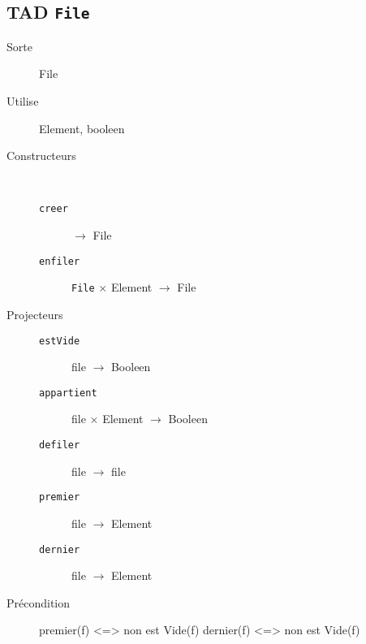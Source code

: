 \subsection{TAD \texttt{File}}
\begin{description}
	\item[Sorte] File
	\item[Utilise] Element, booleen
	\item[Constructeurs]~
		\begin{description}
			\item[\texttt{creer}] $\rightarrow$ File%
			\item[\texttt{enfiler}] \texttt{File} $\times$ Element $\rightarrow$ File
		\end{description}
	\item[Projecteurs] 
		\begin{description}
			\item[\texttt{estVide}] file $\rightarrow$ Booleen
			\item[\texttt{appartient}] file $\times$ Element $\rightarrow$ Booleen
			\item[\texttt{defiler}] file $\rightarrow$ file
			\item[\texttt{premier}] file $\rightarrow$ Element
			\item[\texttt{dernier}] file $\rightarrow$ Element
		\end{description}
	\item[Précondition] premier(f) <=> non est Vide(f) dernier(f) <=> non est Vide(f) 
\end{description}
